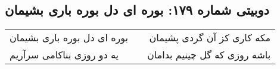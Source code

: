 \begin{center}
\section*{دوبیتی شماره ۱۷۹: بوره ای دل بوره باری بشیمان}
\label{sec:179}
\begin{longtable}{l p{0.5cm} r}
بوره ای دل بوره باری بشیمان
&&
مکه کاری کز آن گردی پشیمان
\\
یه دو روزی بناکامی سرآریم
&&
باشه روزی که گل چینیم بدامان
\\
\end{longtable}
\end{center}
